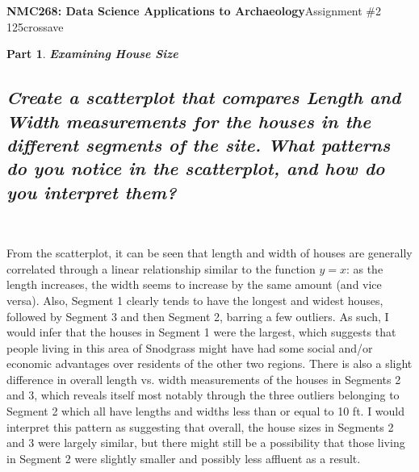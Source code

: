 \documentclass[answers]{exam}
\newtheorem{problem}{Part}
\begin{document}
\pagecolor{opp}
\noindent \textbf{NMC268: Data Science Applications to Archaeology}\hfill Assignment \#2\\
\color{nr}125crossave\color{black}

\hrulefill


\begin{problem}
\textbf{Examining House Size}
\end{problem}
\begin{parts}
    \part{\textit{Create a scatterplot that compares Length and Width measurements for the houses in the different segments of the site. What patterns do you notice in the scatterplot, and how do you interpret them?}}
    \begin{center}
     \\
    \end{center}\color{nr}
    \quad\quad From the scatterplot, it can be seen that length and width of houses are generally correlated through a linear relationship similar to the function $y = x$: as the length increases, the width seems to increase by the same amount (and vice versa). Also, Segment 1 clearly tends to have the longest and widest houses, followed by Segment 3 and then Segment 2, barring a few outliers. As such, I would infer that the houses in Segment 1 were the largest, which suggests that people living in this area of Snodgrass might have had some social and/or economic advantages over residents of the other two regions. There is also a slight difference in overall length vs. width measurements of the houses in Segments 2 and 3, which reveals itself most notably through the three outliers belonging to Segment 2 which all have lengths and widths less than or equal to 10 ft. I would interpret this pattern as suggesting that overall, the house sizes in Segments 2 and 3 were largely similar, but there might still be a possibility that those living in Segment 2 were slightly smaller and possibly less affluent as a result. \color{black}

\end{parts}
\end{document}
